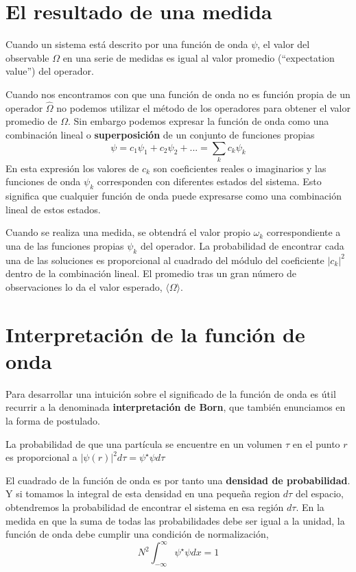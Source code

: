 \section{El resultado de una medida}
\begin{theorem}
Cuando un sistema está descrito por una función de onda
$\psi$, el valor del observable $\Omega$ en una serie 
de medidas es igual al valor promedio (“expectation 
value”) del operador.
\end{theorem}
Cuando nos encontramos con que una función de onda no es
función propia de un operador $\hat{\Omega}$ no podemos
utilizar el método de los operadores para obtener el valor
promedio de $\Omega$. Sin embargo podemos expresar la
función de onda como una combinación lineal o
\textbf{superposición} de un conjunto de funciones
propias
\begin{equation}
\psi =  c_1\psi_1 + c_2\psi_2 + ... = \sum_kc_k\psi_k    
\end{equation}
En esta expresión los valores de $c_k$ son coeficientes
reales o imaginarios y las funciones de onda $\psi_k$
corresponden con diferentes estados del sistema. Esto
significa que cualquier función de onda puede 
expresarse como una combinación lineal de estos estados.

Cuando se realiza una medida, se obtendrá el valor 
propio $\omega_k$ correspondiente a una de las funciones
propias $\psi_k$ del operador. La probabilidad de
encontrar cada una de las soluciones es proporcional
al cuadrado del módulo  del coeficiente $|c_k|^2$ dentro
de la combinación lineal. El promedio tras un gran número
de observaciones lo da el valor esperado, $\langle
\Omega\rangle$.

\section{Interpretación de la función de onda}
Para desarrollar una intuición sobre el significado
de la función de onda es útil recurrir a la 
denominada \textbf{interpretación de 
Born}, que también enunciamos en la forma de 
postulado.
\begin{theorem} 
La probabilidad de que una partícula se encuentre en 
un volumen $\tau$ en el punto $r$ es proporcional
a $|\psi(r)|^2d\tau=\psi^\star \psi d\tau$
\end{theorem}
El cuadrado de la función de onda es por tanto una
\textbf{densidad de probabilidad}. Y si tomamos la
integral de esta densidad en una pequeña region 
$d\tau$ del espacio, obtendremos la probabilidad de
encontrar el sistema en esa región $d\tau$. En la 
medida en que la suma de todas las probabilidades
debe ser igual a la unidad, la función de onda debe 
cumplir una condición de normalización,
\begin{equation}
    N^2\int_{-\infty}^\infty\psi^\star\psi dx=1
    \label{eq:norm}
\end{equation}

